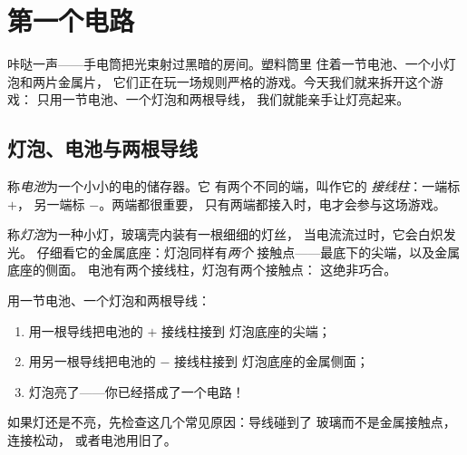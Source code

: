 \chapter{第一个电路}\label{ch:g3:first-electric-circuit}

咔哒一声——手电筒把光束射过黑暗的房间。塑料筒里
住着一节电池、一个小灯泡和两片金属片，
它们正在玩一场规则严格的游戏。今天我们就来拆开这个游戏：
只用一节电池、一个灯泡和两根导线，
我们就能亲手让灯亮起来。

\section{灯泡、电池与两根导线}

\begin{definition}[电池]\label{def:g3:first-electric-circuit:battery}
称\emph{电池}为一个小小的电的储存器。它
有两个不同的端，叫作它的
\emph{接线柱}：一端标 $+$，
另一端标 $-$。两端都很重要，
只有两端都接入时，电才会参与这场游戏。
\end{definition}

\begin{definition}[灯泡]\label{def:g3:first-electric-circuit:bulb}
称\emph{灯泡}为一种小灯，玻璃壳内装有一根细细的灯丝，
当电流流过时，它会白炽发光。
仔细看它的金属底座：灯泡同样有\emph{两个}
接触点——最底下的尖端，以及金属底座的侧面。
电池有两个接线柱，灯泡有两个接触点：
这绝非巧合。
\end{definition}

\begin{method}[点亮灯泡]\label{met:g3:first-electric-circuit:light}
用一节电池、一个灯泡和两根导线：
\begin{enumerate}
  \item 用一根导线把电池的 $+$ 接线柱接到
        灯泡底座的尖端；
  \item 用另一根导线把电池的 $-$ 接线柱接到
        灯泡底座的金属侧面；
  \item 灯泡亮了——你已经搭成了一个电路！
\end{enumerate}
如果灯还是不亮，先检查这几个常见原因：导线碰到了
玻璃而不是金属接触点，连接松动，
或者电池用旧了。
\end{method}


